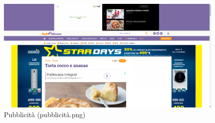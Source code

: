\begin{figure}[h!]
	\centering
	\includegraphics[scale=0.2]{images/pubblicita.png}
	\caption{Pubblicità (pubblicità.png)}
	\label{fig:pubblicita}
\end{figure}


